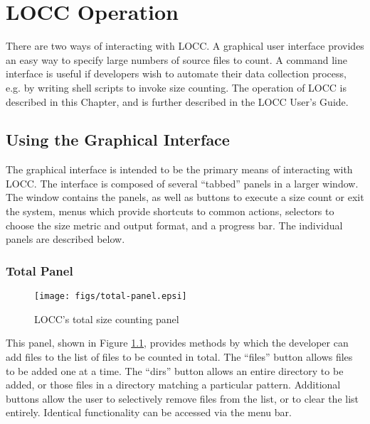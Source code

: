 
\chapter{LOCC Operation}
\label{chap:op}

There are two ways of interacting with LOCC.  A graphical user interface
provides an easy way to specify large numbers of source files to count.  A
command line interface is useful if developers wish to automate their data
collection process, e.g. by writing shell scripts to invoke size counting.
The operation of LOCC is described in this Chapter, and is further
described in the LOCC User's Guide\cite{locc-user}.

\section{Using the Graphical Interface}

The graphical interface is intended to be the primary means of
interacting with LOCC.  The interface is composed of several
``tabbed'' panels in a larger window.  The window contains the panels, 
as well as buttons to execute a size count or exit the system, menus
which provide shortcuts to common actions, selectors to choose the size 
metric and output format, and a progress bar.  The
individual panels are described below.

\subsection{Total Panel}

\begin{figure}
  \texttt{[image: figs/total-panel.epsi]}
  \caption{LOCC's total size counting panel}
  \label{fig:total-panel}
\end{figure}

This panel, shown in Figure \ref{fig:total-panel}, provides methods by which the developer can add files to
the list of files to be counted in total.  The ``files'' button allows 
files to be added one at a time.  The ``dirs'' button allows an entire 
directory to be added, or those files in a directory matching a
particular pattern.  Additional buttons allow the user to selectively
remove files from the list, or to clear the list entirely.  Identical
functionality can be accessed via the menu bar.

